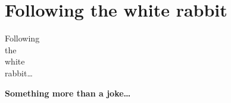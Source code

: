 
\section{Following the white rabbit}

{
\begin{frame}[plain]
    \Huge\bfseries
    \hspace{6.5cm}
    \begin{minipage}{.3\textwidth}
      Following \\
      the \\
      white \\
      rabbit\ldots
    \end{minipage}
\end{frame}
}

{
\begin{frame}[plain]
  \begin{center}
    \Huge\bfseries
    Something more than a joke\ldots
  \end{center}

  \vspace{.3cm}

  \begin{center}
  \end{center}



\end{frame}
}




